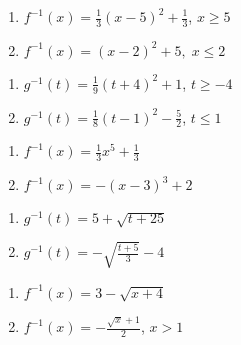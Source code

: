 \begin{multicols}{2}
\begin{enumerate}
\setcounter{enumi}{\value{HW}}


\item $f^{-1}(x) = \frac{1}{3}(x-5)^2+\frac{1}{3}$, $x \geq 5$
\item $f^{-1}(x) = (x - 2)^{2} + 5, \; x \leq 2$

\setcounter{HW}{\value{enumi}}
\end{enumerate}
\end{multicols}

\begin{multicols}{2}
\begin{enumerate}
\setcounter{enumi}{\value{HW}}


\item $g^{-1}(t) = \frac{1}{9}(t+4)^2+1$, $t \geq -4$

\item $g^{-1}(t) = \frac{1}{8}(t-1)^2-\frac{5}{2}$, $t \leq 1$

\setcounter{HW}{\value{enumi}}
\end{enumerate}
\end{multicols}

\begin{multicols}{2}
\begin{enumerate}
\setcounter{enumi}{\value{HW}}

\item $f^{-1}(x) = \frac{1}{3} x^{5} + \frac{1}{3}$
\item $f^{-1}(x) = -(x-3)^3+2$

\setcounter{HW}{\value{enumi}}
\end{enumerate}
\end{multicols}

\begin{multicols}{2}
\begin{enumerate}
\setcounter{enumi}{\value{HW}}

\item $g^{-1}(t) = 5 + \sqrt{t+25}$
\item $g^{-1}(t) = -\sqrt{\frac{t + 5}{3}} - 4$

\setcounter{HW}{\value{enumi}}
\end{enumerate}
\end{multicols}

\begin{multicols}{2}
\begin{enumerate}
\setcounter{enumi}{\value{HW}}

\item $f^{-1}(x) = 3 - \sqrt{x+4}$
\item $f^{-1}(x) =-\frac{\sqrt{x}+1}{2}$, $x > 1$

\setcounter{HW}{\value{enumi}}
\end{enumerate}
\end{multicols}

